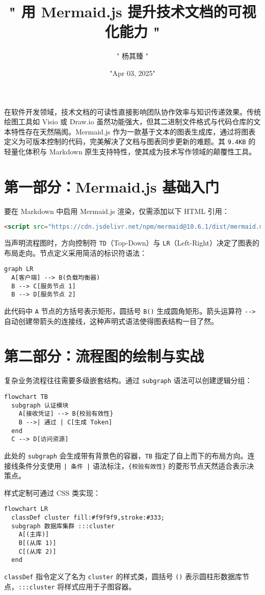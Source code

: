 \title{" 用 Mermaid.js 提升技术文档的可视化能力 "}
\author{" 杨其臻 "}
\date{"Apr 03, 2025"}
\maketitle
在软件开发领域，技术文档的可读性直接影响团队协作效率与知识传递效果。传统绘图工具如 Visio 或 Draw.io 虽然功能强大，但其二进制文件格式与代码仓库的文本特性存在天然隔阂。Mermaid.js 作为一款基于文本的图表生成库，通过将图表定义为可版本控制的代码，完美解决了文档与图表同步更新的难题。其 \verb!9.4KB! 的轻量化体积与 Markdown 原生支持特性，使其成为技术写作领域的颠覆性工具。\par
\chapter{第一部分：Mermaid.js 基础入门}
要在 Markdown 中启用 Mermaid.js 渲染，仅需添加以下 HTML 引用：\par
\begin{lstlisting}[language=html]
<script src="https://cdn.jsdelivr.net/npm/mermaid@10.6.1/dist/mermaid.min.js"></script>
\end{lstlisting}
当声明流程图时，方向控制符 \verb!TD!（Top-Down）与 \verb!LR!（Left-Right）决定了图表的布局走向。节点定义采用简洁的标识符语法：\par
\begin{lstlisting}[language=mermaid]
graph LR
  A[客户端] --> B(负载均衡器)
  B --> C[服务节点 1]
  B --> D[服务节点 2]
\end{lstlisting}
此代码中 \verb!A! 节点的方括号表示矩形，圆括号 \verb!B()! 生成圆角矩形。箭头运算符 \verb!-->! 自动创建带箭头的连接线，这种声明式语法使得图表结构一目了然。\par
\chapter{第二部分：流程图的绘制与实战}
复杂业务流程往往需要多级嵌套结构。通过 \verb!subgraph! 语法可以创建逻辑分组：\par
\begin{lstlisting}[language=mermaid]
flowchart TB
  subgraph 认证模块
    A[接收凭证] --> B{校验有效性}
    B -->| 通过 | C[生成 Token]
  end
  C --> D[访问资源]
\end{lstlisting}
此处的 \verb!subgraph! 会生成带有背景色的容器，\verb!TB! 指定了自上而下的布局方向。连接线条件分支使用 \verb!| 条件 |! 语法标注，\verb!{校验有效性}! 的菱形节点天然适合表示决策点。\par
样式定制可通过 CSS 类实现：\par
\begin{lstlisting}[language=mermaid]
flowchart LR
  classDef cluster fill:#f9f9f9,stroke:#333;
  subgraph 数据库集群 :::cluster
    A[(主库)]
    B[(从库 1)]
    C[(从库 2)]
  end
\end{lstlisting}
\verb!classDef! 指令定义了名为 \verb!cluster! 的样式类，圆括号 \verb!()! 表示圆柱形数据库节点，\verb!:::cluster! 将样式应用于子图容器。\par
